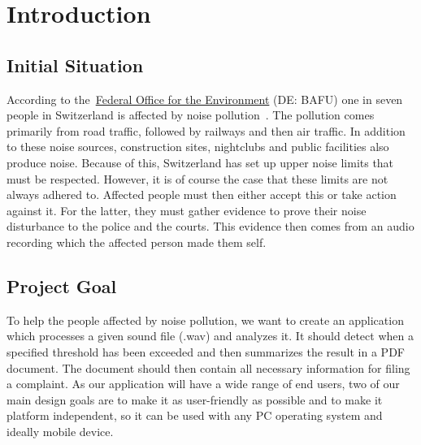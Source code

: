\section{Introduction}\label{sec:introduction}

\subsection{Initial Situation}\label{subsec:initial-situation}
According to the~\href{https://www.bafu.admin.ch//}{Federal Office for the Environment} (DE: BAFU) one in seven people in Switzerland is affected by noise pollution~\cite{foen_noise_pollution}.
The pollution comes primarily from road traffic, followed by railways and then air traffic.
In addition to these noise sources, construction sites, nightclubs and public facilities also produce noise.
Because of this, Switzerland has set up upper noise limits that must be respected.
However, it is of course the case that these limits are not always adhered to.
Affected people must then either accept this or take action against it.
For the latter, they must gather evidence to prove their noise disturbance to the police and the courts.
This evidence then comes from an audio recording which the affected person made them self.

\subsection{Project Goal}\label{subsec:project-goal}
To help the people affected by noise pollution, we want to create an application which processes a given sound file (.wav)
and analyzes it.
It should detect when a specified threshold has been exceeded and then summarizes the result in a PDF document.
The document should then contain all necessary information for filing a complaint.
As our application will have a wide range of end users, two of our main design goals are to make it as user-friendly as possible
and to make it platform independent, so it can be used with any PC operating system and ideally mobile device.

